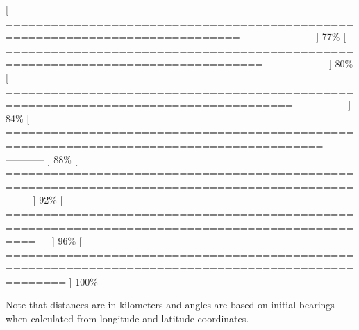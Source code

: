 \documentclass[12pt]{article}\usepackage[]{graphicx}\usepackage[]{xcolor}
\makeatletter
\newenvironment{kframe}{%
 \def\at@end@of@kframe{}%
 \ifinner\ifhmode%
  \def\at@end@of@kframe{\end{minipage}}%
  \begin{minipage}{\columnwidth}%
 \fi\fi%
 \def\FrameCommand##1{\hskip\@totalleftmargin \hskip-\fboxsep
 \colorbox{shadecolor}{##1}\hskip-\fboxsep
     \hskip-\linewidth \hskip-\@totalleftmargin \hskip\columnwidth}%
 \MakeFramed {\advance\hsize-\width
   \@totalleftmargin\z@ \linewidth\hsize
   \@setminipage}}%
 {\par\unskip\endMakeFramed%
 \at@end@of@kframe}
\newenvironment{knitrout}{}{} %
\makeatother
\begin{document}
\begin{knitrout}
\begin{kframe}
{{[ =============================================================================----------------------- ] 77\%
[ ================================================================================-------------------- ] 80\%
[ ====================================================================================---------------- ] 84\%
[ ========================================================================================------------ ] 88\%
[ ============================================================================================-------- ] 92\%
[ ================================================================================================---- ] 96\%
[ ==================================================================================================== ] 100\%
}}\end{kframe}
\end{knitrout}
Note that distances are in kilometers and angles are based on initial bearings \citep[using geosphere::bearing;][]{Hijmans2016geo} when calculated from longitude and latitude coordinates.  
\end{document}
